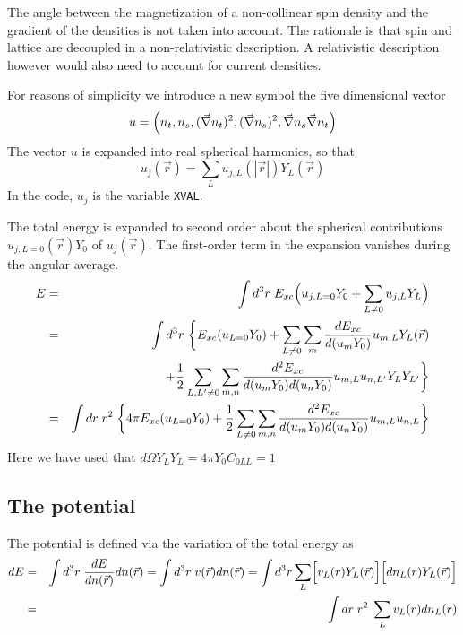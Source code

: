 \documentclass[11pt,a4paper]{report}
\begin{document}
The angle between the magnetization of a non-collinear spin density
and the gradient of the densities is not taken into account. The
rationale is that spin and lattice are decoupled in a non-relativistic
description. A relativistic description however would also need to
account for current densities.

For reasons of simplicity we introduce a new symbol the five
dimensional vector
\begin{equation}
u=\Bigl(n_t,n_s,(\vec{\nabla} n_t)^2,(\vec{\nabla}n_s)^2
,\vec{\nabla}n_s\vec{\nabla}n_t\Bigr)
\end{equation}
The vector $u$ is expanded into real spherical harmonics, so that
\begin{equation}
u_j(\vec{r})=\sum_L u_{j,L}(|\vec{r}|)Y_L(\vec{r})
\end{equation}
In the code, $u_j$ is the variable \verb|XVAL|.

The total energy is expanded to second order about the spherical
contributions $u_{j,L=0}(\vec{r})Y_0$ of $u_j(\vec{r})$. The first-order term in the expansion vanishes during the angular average.
\begin{eqnarray}
E&=&\int d^3r\;
E_{xc}\Bigl(u_{j,L=0}Y_0+\sum_{L\neq0} u_{j,L}Y_L\Bigr)
\nonumber\\
&=&\int d^3r\; 
\biggl\lbrace
E_{xc}(u_{L=0}Y_0)
+\sum_{L\neq 0} 
\sum_m\frac{dE_{xc}}{d(u_mY_0)}
u_{m,L}
Y_L(\vec{r})
\nonumber\\
&&\hspace{1cm}
+\frac{1}{2}\sum_{L,L'\neq 0} 
\sum_{m,n}\frac{d^2E_{xc}}{d(u_mY_0)d(u_nY_0)}
u_{m,L}u_{n,L'}
Y_LY_{L'}
\biggr\rbrace
\nonumber\\
&=&\int dr\;r^2\; \biggl\lbrace
4\pi E_{xc}(u_{L=0}Y_0)
+
\frac{1}{2}
\sum_{L\neq 0} 
\sum_{m,n}
\frac{d^2E_{xc}}{d(u_mY_0)d(u_nY_0)} u_{m,L}u_{n,L}
\biggr\rbrace
\end{eqnarray}
Here we have used that $d\Omega Y_LY_L=4\pi Y_0 C_{0LL}=1$

\subsection{The potential}

The potential is defined via the variation of the total energy as
\begin{eqnarray}
dE&=&
\int d^3r\; \frac{dE}{dn(\vec{r})}dn(\vec{r})
=\int d^3r\; v(\vec{r})dn(\vec{r})
=\int d^3r\sum_L 
\Bigl[v_L(r) Y_L(\vec{r})\Bigr] \Bigl[dn_L(r) Y_L(\vec{r})\Bigr]
\nonumber\\ 
&=& \int dr\; r^2\;  \sum_L v_L(r)dn_L(r)
\end{eqnarray}
\end{document}
